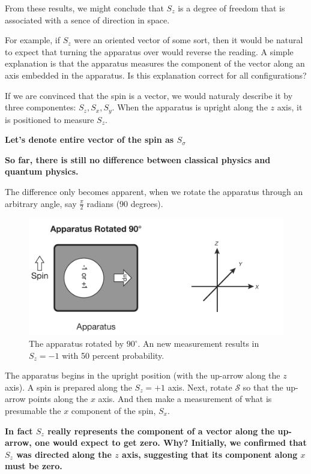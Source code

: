 \documentclass{article}
\begin{document}
From these results, we might conclude that $S_z$ is a degree of freedom that is associated with a sence of direction in space.

For example, if $S_z$ were an oriented vector of some sort, then it would be natural to expect that turning the apparatus over would reverse the reading. A simple explanation is that the apparatus measures the component of the vector along an axis embedded in the apparatus. Is this explanation correct for all configurations?


If we are convinced that the spin is a vector, we would naturaly describe it by three componentes: $S_z, S_x, S_y$. When the apparatus is upright along the $z$ axis, it is positioned to measure $S_z$.

\textbf{Let's denote entire vector of the spin as $S_{\sigma}$}


\textbf{So far, there is still no difference between classical physics and quantum physics.}

The difference only becomes apparent, when we rotate the apparatus through an arbitrary angle, say $\frac{\pi}{2}$ radians (90 degrees).


\begin{figure}[!htbp]
\centering
\includegraphics[scale=0.4]{stern_and_gerlach_3}
\caption{The apparatus rotated by $90^{\circ}$. An new measurement results in $S_z = -1$ with 50 percent probability.}\label{stern_and_gerlach_3_pic}
\end{figure}

The apparatus begins in the upright position (with the up-arrow along the $z$ axis). A spin is prepared along the $S_z = +1$ axis. Next, rotate $\mathcal{S}$ so that the up-arrow points along the $x$ axis. And then make a measurement of what is presumable the $x$ component of the spin, $S_x$.

\textbf{In fact $S_z$  really represents the component of a vector along the up-arrow, one would expect to get zero. Why? Initially, we confirmed that $S_z$ was directed along the $z$ axis, suggesting that its component along $x$ must be zero.}
\end{document}
